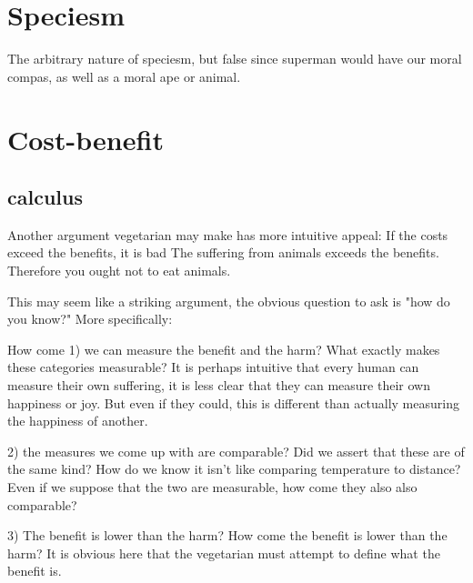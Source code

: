 \documentclass[12pt]{report}
\numberwithin{equation}{section}
\begin{document}


\section{Speciesm}

The arbitrary nature of speciesm, but false since superman would have our moral compas, as well as a moral ape or animal. 

\section{Cost-benefit}

\subsection{calculus}

Another argument vegetarian may make has more intuitive appeal:
If the costs exceed the benefits, it is bad
The suffering from animals exceeds the benefits.
Therefore you ought not to eat animals. 

This may seem like a striking argument, the obvious question to ask is "how do you know?" More specifically:

How come 1) we can measure the benefit and the harm? What exactly makes these categories measurable? It is perhaps intuitive that every human can measure their own suffering, it is less clear that they can measure their own happiness or joy. But even if they could, this is different than actually measuring the happiness of another. 

2) the measures we come up with are comparable? Did we assert that these are of the same kind? How do we know it isn't like comparing temperature to distance? Even if we suppose that the two are measurable, how come they also also comparable?  

3) The benefit is lower than the harm? How come the benefit is lower than the harm? It is obvious here that the vegetarian must attempt to define what the benefit is. 
\end{document}
